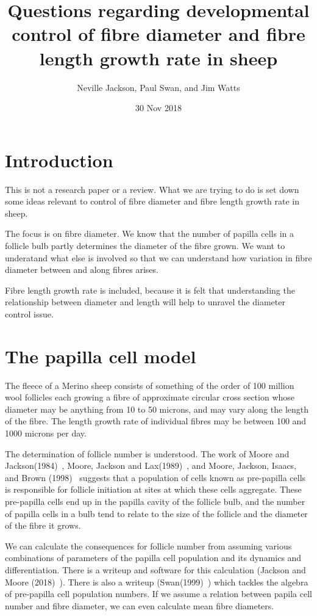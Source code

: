 \documentclass[titlepage]{article}  %
\title{Questions regarding developmental control of fibre diameter and fibre length growth rate in sheep}
\author{Neville Jackson,  Paul Swan, and Jim Watts}
\date{30 Nov 2018}
\begin{document}
 
 
\maketitle      
\tableofcontents

\clearpage
\section{Introduction} 
This is not a research paper or a review. What we are trying to do is set down some ideas relevant to control of fibre diameter and fibre length growth rate in sheep. 

The focus is on fibre diameter. We know that the number of papilla cells in a follicle bulb partly determines the diameter of the fibre grown. We want to  underatand what else is involved so that we can understand how variation in fibre diameter between and along fibres arises. 

Fibre length growth rate is included, because it is felt that understanding the relationship between diameter and length will help to unravel the diameter control issue. 

\section{The papilla cell model}
The fleece of a Merino sheep consists of something of the order of 100 million wool follicles each growing a fibre of approximate circular cross section whose diameter may be anything from 10 to 50 microns, and may vary along the  length of the fibre. The length growth rate of individual fibres may be between 100 and 1000 microns per day. 

The determination of follicle number is understood. The work of Moore and Jackson(1984)~\cite{moor:84}, Moore, Jackson and Lax(1989)~\cite{moor:89}, and Moore, Jackson, Isaacs, and Brown (1998)~\cite{moor:98} suggests that a population of cells known as pre-papilla cells is responsible for follicle initiation at sites at which these cells aggregate. These pre-papilla cells end up in the papilla cavity of the follicle bulb, and the number of papilla cells in a bulb tend to relate to the size of the follicle and the diameter of the fibre it grows.

We can calculate the consequences for follicle number from assuming various combinations of parameters of the papilla cell population and its dynamics and differentiation. There is a writeup and software for this calculation (Jackson and Moore (2018)~\cite{jack:18}). There is also a writeup (Swan(1999)~\cite{swan:99}) which tackles the algebra of pre-papilla cell population numbers. If we assume a relation between papila cell number and fibre diameter, we can even calculate mean fibre diameters.
\end{document}
